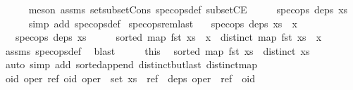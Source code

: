 \begin{isabellebody}
\ \ \ \ \isamarkupfalse%
\ {\isacharparenleft}meson\ assms\ set{\isacharunderscore}subset{\isacharunderscore}Cons\ spec{\isacharunderscore}ops{\isacharunderscore}def\ subsetCE{\isacharparenright}\isanewline
\ \ \isamarkupfalse%
\ \isamarkupfalse%
\ {\isachardoublequoteopen}spec{\isacharunderscore}ops\ deps\ xs{\isachardoublequoteclose}\isanewline
\ \ \ \ \isamarkupfalse%
\ {\isacharparenleft}simp\ add{\isacharcolon}\ spec{\isacharunderscore}ops{\isacharunderscore}def{\isacharparenright}\isanewline
{}\isamarkupfalse%
%
\endisatagproof
{\isafoldproof}%
%
\isadelimproof
\isanewline
%
\endisadelimproof
\isanewline
{}\isamarkupfalse%
\ spec{\isacharunderscore}ops{\isacharunderscore}rem{\isacharunderscore}last{\isacharcolon}\isanewline
\ \ \ {\isachardoublequoteopen}spec{\isacharunderscore}ops\ deps\ {\isacharparenleft}xs\ {\isacharat}\ {\isacharbrackleft}x{\isacharbrackright}{\isacharparenright}{\isachardoublequoteclose}\isanewline
\ \ \ {\isachardoublequoteopen}spec{\isacharunderscore}ops\ deps\ xs{\isachardoublequoteclose}\isanewline
%
\isadelimproof
%
\endisadelimproof
%
\isatagproof
{}\isamarkupfalse%
\ {\isacharminus}\isanewline
\ \ \isamarkupfalse%
\ {\isachardoublequoteopen}sorted\ {\isacharparenleft}map\ fst\ {\isacharparenleft}xs\ {\isacharat}\ {\isacharbrackleft}x{\isacharbrackright}{\isacharparenright}{\isacharparenright}{\isachardoublequoteclose}\ \ {\isachardoublequoteopen}distinct\ {\isacharparenleft}map\ fst\ {\isacharparenleft}xs\ {\isacharat}\ {\isacharbrackleft}x{\isacharbrackright}{\isacharparenright}{\isacharparenright}{\isachardoublequoteclose}\isanewline
\ \ \ \ \isamarkupfalse%
\ assms\ spec{\isacharunderscore}ops{\isacharunderscore}def\ \isamarkupfalse%
\ blast{\isacharplus}\isanewline
\ \ \isamarkupfalse%
\ \isamarkupfalse%
\ this\ \isamarkupfalse%
\ {\isachardoublequoteopen}sorted\ {\isacharparenleft}map\ fst\ xs{\isacharparenright}{\isachardoublequoteclose}\ \ {\isachardoublequoteopen}distinct\ xs{\isachardoublequoteclose}\isanewline
\ \ \ \ \isamarkupfalse%
\ {\isacharparenleft}auto\ simp\ add{\isacharcolon}\ sorted{\isacharunderscore}append\ distinct{\isacharunderscore}butlast\ distinct{\isacharunderscore}map{\isacharparenright}\isanewline
\ \ \isamarkupfalse%
\ \isamarkupfalse%
\ {\isachardoublequoteopen}{\isasymforall}oid\ oper\ ref{\isachardot}\ {\isacharparenleft}oid{\isacharcomma}\ oper{\isacharparenright}\ {\isasymin}\ set\ xs\ {\isasymand}\ ref\ {\isasymin}\ deps\ oper\ {\isasymlongrightarrow}\ ref\ {\isacharless}\ oid{\isachardoublequoteclose}\isanewline

\end{isabellebody}
